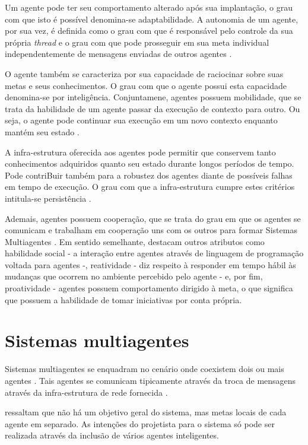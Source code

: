 Um agente pode ter seu comportamento alterado após sua implantação, o grau com que isto é possível denomina-se adaptabilidade. A autonomia de um agente, por sua vez, é definida como o grau com que é responsável pelo controle da sua própria \textit{thread} e o grau com que pode prosseguir em sua meta individual independentemente de mensagens enviadas de outros agentes \cite{griss2001software}.

O agente também se caracteriza por sua capacidade de raciocinar sobre suas metas e seus conhecimentos. O grau com que o agente possui esta capacidade denomina-se por inteligência. Conjuntamene, agentes possuem mobilidade, que se trata da habilidade de um agente passar da execução de contexto para outro. Ou seja, o agente pode continuar sua execução em um novo contexto enquanto mantém seu estado \cite{griss2001software}.

A infra-estrutura oferecida aos agentes pode permitir que conservem tanto conhecimentos adquiridos quanto seu estado durante longos períodos de tempo. Pode contriBuir também para a robustez dos agentes diante de possíveis falhas em tempo de execução. O grau com que a infra-estrutura cumpre estes critérios intitula-se persistência \cite{griss2001software}.

Ademais, agentes possuem cooperação, que se trata do grau em que os agentes se comunicam e trabalham em cooperação uns com os outros para formar Sistemas Multiagentes \cite{griss2001software}. Em sentido semelhante,  destacam outros atributos como habilidade social - a interação entre agentes através de linguagem de programação voltada para agentes -, reatividade -  diz respeito à responder em tempo hábil às mudanças que ocorrem no ambiente percebido pelo agente - e, por fim, proatividade - agentes possuem comportamento dirigido à meta, o que significa que possuem a habilidade de tomar iniciativas por conta própria.

\section{Sistemas multiagentes}

Sistemas multiagentes se enquadram no cenário onde coexistem dois ou mais agentes \cite{mcarthur2007multi}. Tais agentes se comunicam tipicamente através da troca de mensagens através da infra-estrutura de rede fornecida \cite[pág. 3]{livrao}.

 ressaltam que não há um objetivo geral do sistema, mas metas locais de cada agente em separado. As intenções do projetista para o sistema só pode ser realizada através da inclusão de vários agentes inteligentes.


